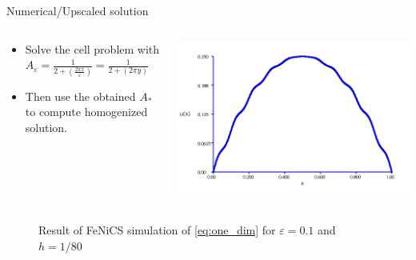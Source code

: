 \documentclass{beamer}
\renewcommand{\epsilon}{\varepsilon}
\begin{document}
\begin{frame}[t]{Numerical/Upscaled solution}
\begin{columns}
    \begin{column}[c]{.5\textwidth}
      \begin{itemize}
      \item Solve the cell problem with $A_{\epsilon}=\frac{1}{2+ \left( \frac{2\pi x}{\epsilon} \right)} = \frac{1}{2+ \left( 2\pi y \right)}$
      \item Then use the obtained $A_{*}$ to compute homogenized solution.
    \end{itemize}
  \end{column}
  \begin{column}[c]{.5\textwidth}

    \includegraphics[width=0.85\linewidth]{one_dim_approx.png}
 \end{column}
\end{columns}  
\begin{figure}[ht]
    \centering
    
    \caption{Result of FeNiCS simulation of \eqref{eq:one_dim} for $\epsilon=0.1$ and $h = 1/80$}
    \label{fig:one_dim_approx}
\end{figure}

\end{frame}
\end{document}
